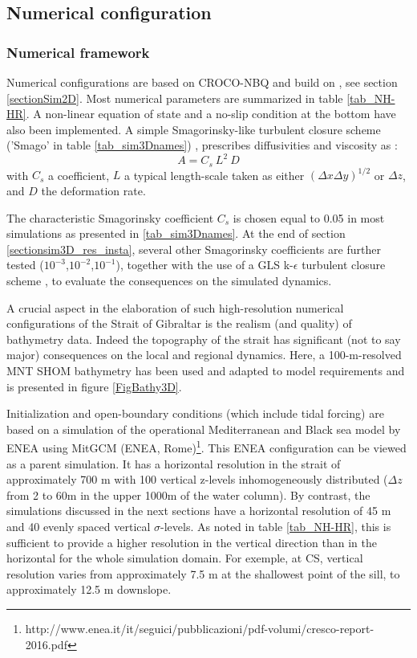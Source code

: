 \subsection{Numerical configuration}
\label{section3Dnum}

\subsubsection{Numerical framework}

Numerical configurations are based on CROCO-NBQ and build on \citet{hilt_2020}, see section \ref{sectionSim2D}. Most numerical parameters are summarized in table \ref{tab_NH-HR}. A non-linear equation of state and a no-slip condition at the bottom have also been implemented. A simple Smagorinsky-like turbulent closure scheme ('Smago' in table \ref{tab_sim3Dnames}) \citep{smagorinsky_1963}, prescribes diffusivities and viscosity as :
\begin{equation}
    A = C_s \ L^2 \ D
\end{equation}
with $C_s$ a coefficient, $L$ a typical length-scale taken as either $(\Delta x \Delta y)^{1/2}$ or $\Delta z$, and $D$ the deformation rate.

The characteristic Smagorinsky coefficient $C_s$ is chosen equal to 0.05 in most simulations as presented in \ref{tab_sim3Dnames}. At the end of section \ref{sectionsim3D_res_insta}, several other Smagorinsky coefficients are further tested  ($10^{-3}$,$10^{-2}$,$10^{-1}$), together with the use of a GLS k-$\epsilon$ turbulent closure scheme \citep{umlauf_2003}, to evaluate the consequences on the simulated dynamics.

A crucial aspect in the elaboration of such high-resolution numerical configurations of the Strait of Gibraltar is the realism (and quality) of bathymetry data. Indeed the topography of the strait has significant (not to say major) consequences on the local and regional dynamics. Here, a 100-m-resolved MNT SHOM bathymetry has been used and adapted to model requirements and is presented in figure \ref{FigBathy3D}.

Initialization and open-boundary conditions (which include tidal forcing) are based on a simulation of the operational Mediterranean and Black sea model by ENEA using MitGCM (ENEA, Rome)\footnote{http://www.enea.it/it/seguici/pubblicazioni/pdf-volumi/cresco-report-2016.pdf}. This ENEA configuration can be viewed as a parent simulation. It has a horizontal resolution in the strait of approximately 700 m with 100 vertical z-levels inhomogeneously distributed ($\Delta z$ from 2 to 60m in the upper 1000m of the water column). By contrast, the simulations discussed in the next sections have a horizontal resolution of 45 m and 40 evenly spaced vertical $\sigma$-levels. As noted in table \ref{tab_NH-HR}, this is sufficient to provide a higher resolution in the vertical direction than in the horizontal for the whole simulation domain. For exemple, at CS, vertical resolution varies from approximately 7.5 m at the shallowest point of the sill, to approximately 12.5 m downslope.

